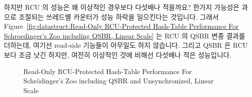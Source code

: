 하지만 RCU 의 성능은 왜 이상적인 경우보다 다섯배나 적을까요?
한가지 가능성은  과  으로 조절되는
쓰레드별 카운터가 성능 하락을 일으킨다는 것입니다.
그래서
Figure~\ref{fig:datastruct:Read-Only RCU-Protected Hash-Table Performance For Schroedinger's Zoo including QSBR, Linear Scale}
는 RCU 의 QSBR 변종 결과를 더하는데, 여기선 read-side 기능들이 아무일도 하지
않습니다.
그리고 QSBR 은 RCU 보다 조금 낫긴 하지만, 여전히 이상적인 것에 비해선 다섯배나
적은 성능입니다.

\begin{figure}[tb]
\centering
{}
\caption{Read-Only RCU-Protected Hash-Table Performance For Schr\"odinger's Zoo including QSBR and Unsynchronized, Linear Scale}
\label{fig:datastruct:Read-Only RCU-Protected Hash-Table Performance For Schroedinger's Zoo including QSBR and Unsynchronized, Linear Scale}
\end{figure}

